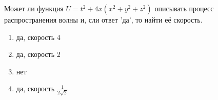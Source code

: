 Может ли функция \(U=t^2+4x\left(x^2 + y^2+z^2\right)\) описывать процесс распространения волны и, сли ответ 'да', то найти её скорость.

\begin{enumerate}[label=\arabic*)]
    \item да, скорость 4
    \item да, скорость 2
    \item нет
    \item да, скорость \(\frac{1}{2\sqrt{2}}\)
\end{enumerate}

